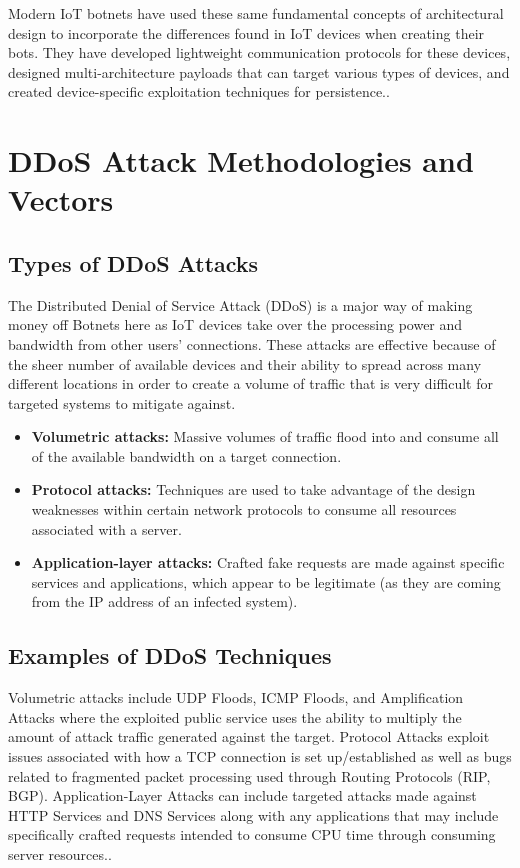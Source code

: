 \documentclass[12pt,letterpaper]{report}
\begin{document}
Modern IoT botnets have used these same fundamental concepts of architectural design to incorporate the differences found in IoT devices when creating their bots. They have developed lightweight communication protocols for these devices, designed multi-architecture payloads that can target various types of devices, and created device-specific exploitation techniques for persistence.\cite{gartner2023iot, kuzin2018analysis}.

\section{DDoS Attack Methodologies and Vectors}

\subsection{Types of DDoS Attacks}

The Distributed Denial of Service Attack (DDoS) is a major way of making money off Botnets here as IoT devices take over the processing power and bandwidth from other users’ connections. These attacks are effective because of the sheer number of available devices and their ability to spread across many different locations in order to create a volume of traffic that is very difficult for targeted systems to mitigate against. 

\begin{itemize}
    \item \textbf{Volumetric attacks:} Massive volumes of traffic flood into and consume all of the available bandwidth on a target connection.
    \item \textbf{Protocol attacks:} Techniques are used to take advantage of the design weaknesses within certain network protocols to consume all resources associated with a server.
    \item \textbf{Application-layer attacks:} Crafted fake requests are made against specific services and applications, which appear to be legitimate (as they are coming from the IP address of an infected system). 
\end{itemize}


\subsection{Examples of DDoS Techniques}

Volumetric attacks include UDP Floods, ICMP Floods, and Amplification Attacks where the exploited public service uses the ability to multiply the amount of attack traffic generated against the target. Protocol Attacks exploit issues associated with how a TCP connection is set up/established as well as bugs related to fragmented packet processing used through Routing Protocols (RIP, BGP). Application-Layer Attacks can include targeted attacks made against HTTP Services and DNS Services along with any applications that may include specifically crafted requests intended to consume CPU time through consuming server resources.\cite{zargar2013survey}.
\end{document}

